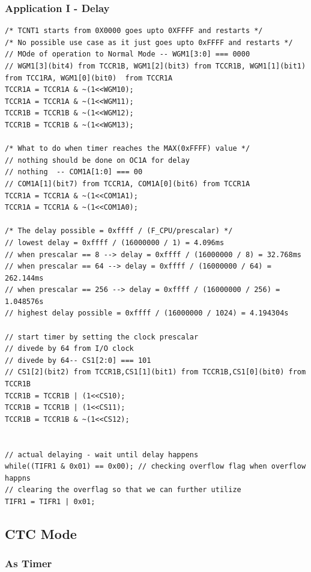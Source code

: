 \documentclass{article}
\begin{document}
\subsubsection{Application I - Delay}
\begin{verbatim}
/* TCNT1 starts from 0X0000 goes upto 0XFFFF and restarts */
/* No possible use case as it just goes upto 0xFFFF and restarts */
// MOde of operation to Normal Mode -- WGM1[3:0] === 0000
// WGM1[3](bit4) from TCCR1B, WGM1[2](bit3) from TCCR1B, WGM1[1](bit1)  from TCC1RA, WGM1[0](bit0)  from TCCR1A	
TCCR1A = TCCR1A & ~(1<<WGM10);
TCCR1A = TCCR1A & ~(1<<WGM11);
TCCR1B = TCCR1B & ~(1<<WGM12);
TCCR1B = TCCR1B & ~(1<<WGM13);

/* What to do when timer reaches the MAX(0xFFFF) value */
// nothing should be done on OC1A for delay
// nothing  -- COM1A[1:0] === 00
// COM1A[1](bit7) from TCCR1A, COM1A[0](bit6) from TCCR1A
TCCR1A = TCCR1A & ~(1<<COM1A1);
TCCR1A = TCCR1A & ~(1<<COM1A0);
    
/* The delay possible = 0xffff / (F_CPU/prescalar) */
// lowest delay = 0xffff / (16000000 / 1) = 4.096ms
// when prescalar == 8 --> delay = 0xffff / (16000000 / 8) = 32.768ms
// when prescalar == 64 --> delay = 0xffff / (16000000 / 64) = 262.144ms
// when prescalar == 256 --> delay = 0xffff / (16000000 / 256) = 1.048576s
// highest delay possible = 0xffff / (16000000 / 1024) = 4.194304s

// start timer by setting the clock prescalar
// divede by 64 from I/O clock
// divede by 64-- CS1[2:0] === 101
// CS1[2](bit2) from TCCR1B,CS1[1](bit1) from TCCR1B,CS1[0](bit0) from TCCR1B
TCCR1B = TCCR1B | (1<<CS10);
TCCR1B = TCCR1B | (1<<CS11);
TCCR1B = TCCR1B & ~(1<<CS12);


// actual delaying - wait until delay happens
while((TIFR1 & 0x01) == 0x00); // checking overflow flag when overflow happns
// clearing the overflag so that we can further utilize
TIFR1 = TIFR1 | 0x01;
\end{verbatim}

\subsection{CTC Mode}
\subsubsection{As Timer}
\end{document}
